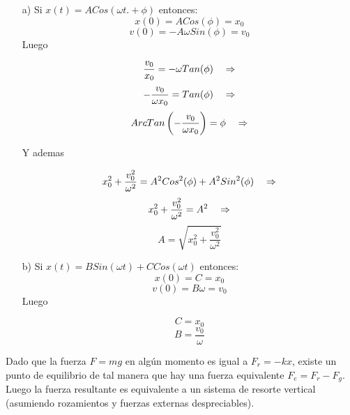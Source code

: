\documentclass[a4paper]{article}
\begin{document}
\begin{answer}[Problema 3.]

    \begin{enumerate}
        \item[a)] Si $x(t) = ACos(\omega t. + \phi)$ entonces:
            $$x(0) = ACos(\phi) = x_0$$
            $$v(0) = -A\omega Sin(\phi) = v_0$$
            Luego

            $$\frac{v_0}{x_0} = -\omega Tan(\phi)\hspace{0.35cm}\Rightarrow$$
            $$-\frac{v_0}{\omega x_0} =  Tan(\phi)\hspace{0.35cm}\Rightarrow$$
            $$ArcTan\left(-\frac{v_0}{\omega x_0}\right) =  \phi\hspace{0.35cm}\Rightarrow$$

            Y ademas

            $$x_0^2 + \frac{v_0^2}{\omega^2} = A^2Cos^2(\phi) + A^2Sin^2(\phi)\hspace{0.35cm}\Rightarrow $$
            $$x_0^2 + \frac{v_0^2}{\omega^2} = A^2\hspace{0.35cm}\Rightarrow $$
            $$A = \sqrt{x_0^2 + \frac{v_0^2}{\omega^2}}$$

        \item[b)] Si
            $x(t) = BSin(\omega t) + CCos(\omega t) $ entonces:
            $$x(0) = C = x_0$$
            $$v(0) = B\omega = v_0$$
            Luego

            $$C = x_0$$
            $$B = \frac{v_0}{\omega}$$

    \end{enumerate}
\end{answer}
\begin{answer}[Problema 4.]
    Dado que la fuerza $F=mg$ en algún momento es igual a $F_r=-kx$, existe un punto de equilibrio de tal manera que hay una fuerza equivalente $F_e = F_r - F_g$. Luego la fuerza resultante es equivalente a un sistema de resorte vertical (asumiendo rozamientos y fuerzas externas despreciables).
\end{answer}
\end{document}

